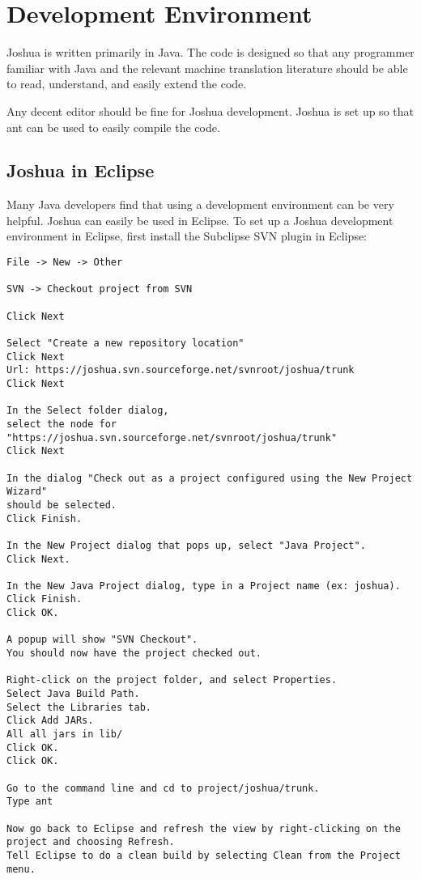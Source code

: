 \section{Development Environment}

Joshua is written primarily in Java. The code is designed so that any programmer familiar with Java and the relevant machine translation literature should be able to read, understand, and easily extend the code.

Any decent editor should be fine for Joshua development. Joshua is set up so that ant can be used to easily compile the code.

\subsection{Joshua in Eclipse}

Many Java developers find that using a development environment can be very helpful. Joshua can easily be used in Eclipse. To set up a Joshua development environment in Eclipse, first install the Subclipse SVN plugin in Eclipse:

\begin{verbatim}
File -> New -> Other

SVN -> Checkout project from SVN

Click Next

Select "Create a new repository location" 
Click Next
Url: https://joshua.svn.sourceforge.net/svnroot/joshua/trunk
Click Next

In the Select folder dialog, 
select the node for "https://joshua.svn.sourceforge.net/svnroot/joshua/trunk"
Click Next

In the dialog "Check out as a project configured using the New Project Wizard" 
should be selected.
Click Finish.

In the New Project dialog that pops up, select "Java Project".
Click Next.

In the New Java Project dialog, type in a Project name (ex: joshua).
Click Finish.
Click OK.

A popup will show "SVN Checkout".
You should now have the project checked out.

Right-click on the project folder, and select Properties.
Select Java Build Path.
Select the Libraries tab.
Click Add JARs.
All all jars in lib/
Click OK.
Click OK.

Go to the command line and cd to project/joshua/trunk.
Type ant

Now go back to Eclipse and refresh the view by right-clicking on the project and choosing Refresh.
Tell Eclipse to do a clean build by selecting Clean from the Project menu.

\end{verbatim}
